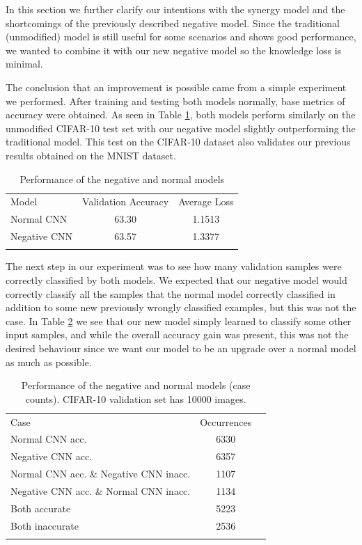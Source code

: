 \documentclass[b5paper]{book}
\begin{document}
In this section we further clarify our intentions with the synergy model and the shortcomings of the previously described negative model. Since the traditional (unmodified) model is still useful for some scenarios and shows good performance, we wanted to combine it with our new negative model so the knowledge loss is minimal. 

The conclusion that an improvement is possible came from a simple experiment we performed. After training and testing both models normally, base metrics of accuracy were obtained. As seen in Table \ref{tab:1}, both models perform similarly on the unmodified CIFAR-10 test set with our negative model slightly outperforming the traditional model. This test on the CIFAR-10 dataset also validates our previous results obtained on the MNIST dataset. 

\begin{table}
\centering
\caption{Performance of the negative and normal models}
\label{tab:1}
\begin{tabular}{lcc}
\hline\noalign{\smallskip}
Model & Validation Accuracy & Average Loss  \\
\noalign{\smallskip}\hline\noalign{\smallskip}
Normal CNN & 63.30 & 1.1513 \\
Negative CNN & 63.57 & 1.3377 \\
\noalign{\smallskip}\hline
\end{tabular}
\end{table}

The next step in our experiment was to see how many validation samples were correctly classified by both models. We expected that our negative model would correctly classify all the samples that the normal model correctly classified in addition to some new previously wrongly classified examples, but this was not the case. In Table \ref{tab:2} we see that our new model simply learned to classify some other input samples, and while the overall accuracy gain was present, this was not the desired behaviour since we want our model to be an upgrade over a normal model as much as possible. 

\begin{table}
\centering
\caption{Performance of the negative and normal models (case counts). CIFAR-10 validation set has 10000 images.}
\label{tab:2}
\begin{tabular}{lcc}
\hline\noalign{\smallskip}
Case & Occurrences \\
\noalign{\smallskip}\hline\noalign{\smallskip}
Normal CNN acc. & 6330 \\
Negative CNN acc. & 6357 \\
Normal CNN acc. \& Negative CNN inacc. & 1107 \\
Negative CNN acc. \& Normal CNN inacc. & 1134 \\
Both accurate & 5223 \\
Both inaccurate & 2536 \\
\noalign{\smallskip}\hline
\end{tabular}
\end{table}
\end{document}
